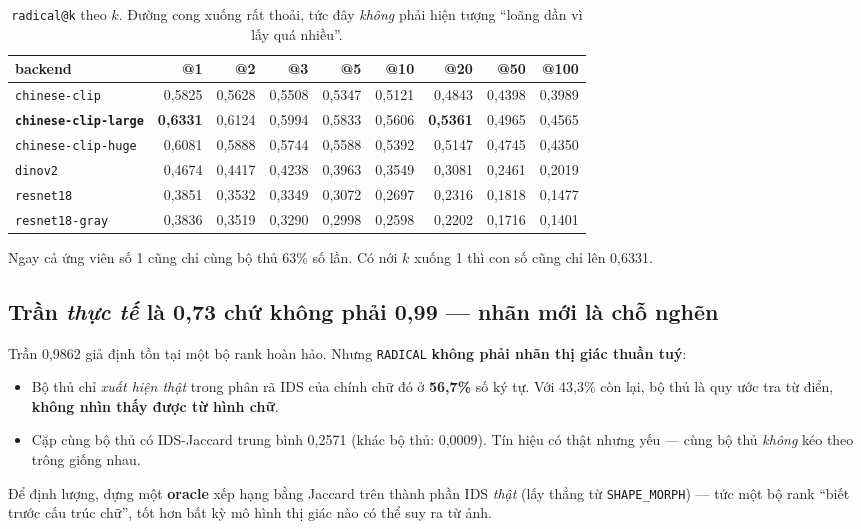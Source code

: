 \documentclass[11pt,a4paper]{article}
\newcommand{\code}[1]{\texttt{#1}}
\begin{document}
\begin{table}[h]
\centering
\small
\begin{tabular}{lrrrrrrrr}
\toprule
backend & @1 & @2 & @3 & @5 & @10 & @20 & @50 & @100 \\
\midrule
\code{chinese-clip} & 0,5825 & 0,5628 & 0,5508 & 0,5347 & 0,5121 & 0,4843 & 0,4398 & 0,3989 \\
\textbf{\code{chinese-clip-large}} & \textbf{0,6331} & 0,6124 & 0,5994 & 0,5833 & 0,5606 & \textbf{0,5361} & 0,4965 & 0,4565 \\
\code{chinese-clip-huge} & 0,6081 & 0,5888 & 0,5744 & 0,5588 & 0,5392 & 0,5147 & 0,4745 & 0,4350 \\
\code{dinov2} & 0,4674 & 0,4417 & 0,4238 & 0,3963 & 0,3549 & 0,3081 & 0,2461 & 0,2019 \\
\code{resnet18} & 0,3851 & 0,3532 & 0,3349 & 0,3072 & 0,2697 & 0,2316 & 0,1818 & 0,1477 \\
\code{resnet18-gray} & 0,3836 & 0,3519 & 0,3290 & 0,2998 & 0,2598 & 0,2202 & 0,1716 & 0,1401 \\
\bottomrule
\end{tabular}
\caption{\code{radical@k} theo $k$. Đường cong xuống rất thoải, tức đây \emph{không} phải hiện
tượng ``loãng dần vì lấy quá nhiều''.}
\end{table}

Ngay cả ứng viên số 1 cũng chỉ cùng bộ thủ 63\% số lần. Có nới $k$ xuống 1 thì con số cũng chỉ lên
0,6331.

\subsection{Trần \emph{thực tế} là 0,73 chứ không phải 0,99 --- nhãn mới là chỗ nghẽn}

Trần 0,9862 giả định tồn tại một bộ rank hoàn hảo. Nhưng \code{RADICAL} \textbf{không phải nhãn thị
giác thuần tuý}:

\begin{itemize}
  \item Bộ thủ chỉ \emph{xuất hiện thật} trong phân rã IDS của chính chữ đó ở \textbf{56,7\%} số ký
        tự. Với 43,3\% còn lại, bộ thủ là quy ước tra từ điển, \textbf{không nhìn thấy được từ hình
        chữ}.
  \item Cặp cùng bộ thủ có IDS-Jaccard trung bình 0,2571 (khác bộ thủ: 0,0009). Tín hiệu có thật
        nhưng yếu --- cùng bộ thủ \emph{không} kéo theo trông giống nhau.
\end{itemize}

Để định lượng, dựng một \textbf{oracle} xếp hạng bằng Jaccard trên thành phần IDS \emph{thật} (lấy
thẳng từ \code{SHAPE\_MORPH}) --- tức một bộ rank ``biết trước cấu trúc chữ'', tốt hơn bất kỳ mô
hình thị giác nào có thể suy ra từ ảnh.
\end{document}
